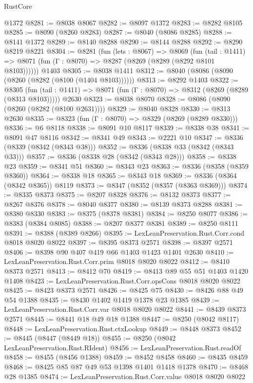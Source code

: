 \begin{lexlean}{RustCore}
\begin{coremodule}
    @1372
@8281 := @8038 @8067
@8282 := @8097 @1372
@8283 := @8282 @8105
@8285 := @8090 (@8260 @8283)
@8287 := @8040 (@8086 @8285)
@8288 := @8141 @1372
@8289 := @8140 @8288
@8290 := @8144 @8288
@8292 := @8290 @8219 @8221
@8304 := @8281
    (fun (lets : @8067) =>
    @8069
      (fun (tail : @1411) => @8071 (fun (Γ : @8070) => @8287 (@8269 (@8289 (@8292 @8101 @8103))))))
    @1403
@8305 := @8038 @1411
@8312 := @8040 (@8086 (@8090 (@8260 (@8282 (@8100 (@1404 @8103))))))
@8313 := @8292 @1403
@8322 := @8305
    (fun (tail : @1411) => @8071 (fun (Γ : @8070) => @8312 (@8269 (@8289 (@8313 @8103)))))
    @2630
@8323 := @8038 @8070
@8328 := @8086 (@8090 (@8260 (@8282 (@8100 @2631))))
@8329 := @8040 @8328
@8330 := @8313 @2630
@8335 := @8323 (fun (Γ : @8070) => @8329 (@8269 (@8289 @8330)))
@8336 := @6 @8118
@8338 := @8091 @10 @8117
@8339 := @8338 @38
@8341 := @8091 @47 @8116
@8342 := @8341 @49
@8343 := @2221 @10
@8347 := @8336 (@8339 (@8342 (@8343 @38)))
@8352 := @8336 (@8338 @33 (@8342 (@8343 @33)))
@8357 := @8336 (@8338 @28 (@8342 (@8343 @28)))
@8358 := @8338 @23
@8359 := @8341 @51
@8360 := @8343 @23
@8363 := @8336 (@8358 (@8359 @8360))
@8364 := @8338 @18
@8365 := @8343 @18
@8369 := @8336 (@8364 (@8342 @8365)) @8119
@8373 := @8347 (@8352 (@8357 (@8363 @8369)))
@8374 := @8335 @8373
@8375 := @8207 @8328
@8376 := @8132 @8373
@8377 := @8267 @8376
@8378 := @8040 @8377
@8380 := @8139 @8373 @8288
@8381 := @8380 @8330
@8383 := @8375 (@8378 @8381)
@8384 := @8250 @8077
@8386 := @8383 (@8384 @8085)
@8388 := @8207 @8377 @8381
@8389 := @8250 @8111
@8391 := @8388 (@8389 @8266)
@8395 := LexLeanPreservation.Rust.Corr.cond @8018 @8020 @8022
@8397 := @8395 @8373 @2571
@8398 := @8397 @2571
@8406 := @8398 @90 @407 @419 @66 @1403 @1423 @1401 @2630
@8410 := LexLeanPreservation.Rust.Corr.prim @8018 @8020 @8022
@8412 := @8410 @8373 @2571
@8413 := @8412 @70
@8419 := @8413 @89 @55 @51 @1403 @1420 @1408
@8423 := LexLeanPreservation.Rust.Corr.opsCons @8018 @8020 @8022
@8425 := @8423 @8373 @2571
@8426 := @8425 @75
@8430 := @8426 @88 @49 @54 @1388
@8435 := @8430 @1402 @1419 @1378 @23 @1385
@8439 := LexLeanPreservation.Rust.Corr.var @8018 @8020 @8022
@8441 := @8439 @8373 @2571
@8445 := @8441 @18 @49 @18 @1388
@8447 := @8250 (@8042 @8117)
@8448 := LexLeanPreservation.Rust.ctxLookup
@8449 := @8448 @8373
@8452 := @8445 (@8447 (@8449 @18))
@8455 := @8250 (@8042 LexLeanPreservation.Rust.RIdent)
@8456 := LexLeanPreservation.Rust.readOf
@8458 := @8455 (@8456 @1388)
@8459 := @8452 @8458
@8460 := @8435 @8459
@8468 := @8425 @85 @87 @49 @53 @1398 @1401 @1418 @1378
@8470 := @8468 @28 @1385
@8474 := LexLeanPreservation.Rust.Corr.value @8018 @8020 @8022

\end{coremodule}
\end{lexlean}
